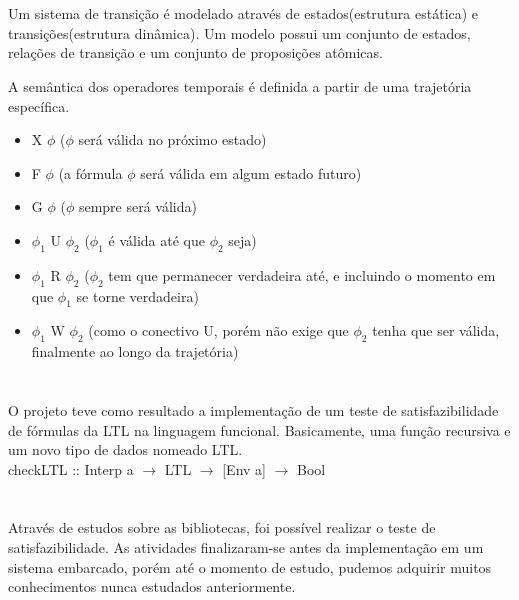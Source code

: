 \documentclass{sciposter}
\newcommand{\tituloA}[1]{\Large{\emph{\textbf{\color{white}{#1}}}}}
\begin{document}
\begin{multicols}{3}
{\section*{\tituloA{Semântica da Lógica Temporal}}

Um sistema de transição é modelado através de estados(estrutura estática) e transições(estrutura dinâmica). Um modelo possui um conjunto de estados, relações de transição e um conjunto de proposições atômicas.
\par A semântica dos operadores temporais é definida a partir de uma trajetória específica.
\begin{itemize}
	\item X $\phi$ ($\phi$ será válida no próximo estado)
	\item F $\phi$ (a fórmula $\phi$ será válida em algum estado futuro)
	\item G $\phi$ ($\phi$ sempre será válida)
	\item $\phi _{1}$ U $\phi _{2}$ ($\phi _{1}$ é válida até que $\phi _{2}$ seja)
	\item $\phi _{1}$ R $\phi _{2}$ ($\phi _{2}$ tem que permanecer verdadeira até, e incluindo o momento em que $\phi _{1}$ se torne verdadeira)
	\item $\phi _{1}$ W $\phi _{2}$ (como o conectivo U, porém não exige que $\phi _{2}$ tenha que ser válida, finalmente ao longo da trajetória) 
\end{itemize}

\section*{\tituloA{Resultados Obtidos}}
O projeto teve como resultado a implementação de um teste de satisfazibilidade de fórmulas da LTL na linguagem funcional. Basicamente, uma função recursiva e um novo tipo de dados nomeado LTL.\\
checkLTL :: Interp a $\rightarrow $ LTL $\rightarrow $ [Env a] $\rightarrow $ Bool	

\section*{\tituloA{Conclusões}}
Através de estudos sobre as bibliotecas, foi possível realizar o teste de satisfazibilidade. As atividades finalizaram-se antes da implementação em um sistema embarcado, porém até o momento de estudo, pudemos adquirir muitos conhecimentos nunca estudados anteriormente.

  \section*{\tituloA{Referências}}
  \renewcommand{\section}[2]{}
  
  

  }\end{multicols}


\cite{ferreira}
\end{document}

